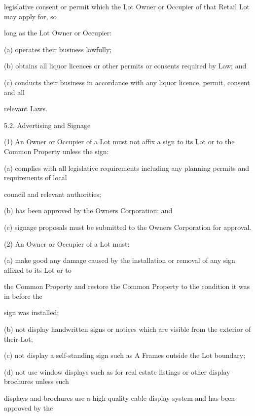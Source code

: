 \documentclass{article}
\begin{document}
{\fontsize{10.02}{1}legislative consent or permit which the Lot Owner or Occupier of that Retail Lot may apply for, so }

{\fontsize{10.02}{1}long as the Lot Owner or Occupier: }

{\fontsize{9.962}{1}(a) operates their business lawfully; }

{\fontsize{9.962}{1}(b) obtains all liquor licences or other permits or consents required by Law; and }

{\fontsize{9.962}{1}(c) conducts their business in accordance with any liquor licence, permit, consent and all }

{\fontsize{10.02}{1}relevant Laws. }

{\fontsize{9.99}{1}5.2. Advertising and Signage }

{\fontsize{9.962}{1}(1) An Owner or Occupier of a Lot must not affix a sign to its Lot or to the Common Property unless the sign: }

{\fontsize{9.962}{1}(a) complies with all legislative requirements including any planning permits and requirements of local }

{\fontsize{10.02}{1}council and relevant authorities; }

{\fontsize{9.962}{1}(b) has been approved by the Owners Corporation; and }

{\fontsize{9.962}{1}(c) signage proposals must be submitted to the Owners Corporation for approval. }

{\fontsize{9.962}{1}(2) An Owner or Occupier of a Lot must: }

{\fontsize{9.962}{1}(a) make good any damage caused by the installation or removal of any sign affixed to its Lot or to }

{\fontsize{10.02}{1}the Common Property and restore the Common Property to the condition it was in before the }

{\fontsize{10.02}{1}sign was installed; }

{\fontsize{9.962}{1}(b) not display handwritten signs or notices which are visible from the exterior of their Lot; }

{\fontsize{9.962}{1}(c) not display a self-standing sign such as A Frames outside the Lot boundary; }

{\fontsize{9.962}{1}(d) not use window displays such as for real estate listings or other display brochures unless such }

{\fontsize{10.02}{1}displays and brochures use a high quality cable display system and has been approved by the }
\end{document}
